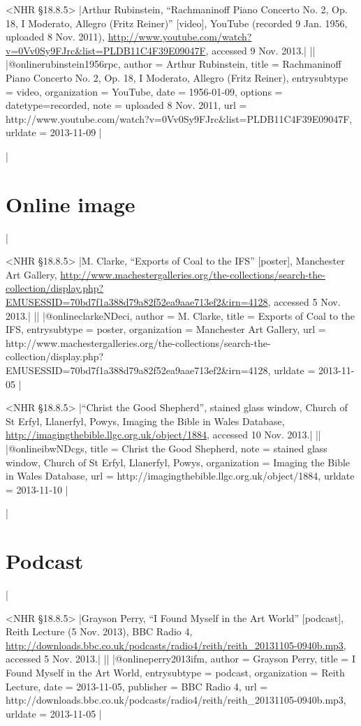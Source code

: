 \documentclass[extrafontsizes,11pt,a4paper,oneside]{memoir}
\begin{document}
\bibexample<NHR \S18.8.5>
|Arthur Rubinstein, \enquote{Rachmaninoff Piano Concerto No. 2, Op. 18, I Moderato, Allegro (Fritz Reiner)} [video], YouTube (recorded 9 Jan. 1956, uploaded 8 Nov. 2011), \url{http://www.youtube.com/watch?v=0Vv0Sy9FJrc&list=PLDB11C4F39E09047F}, accessed 9 Nov. 2013.|%
||%
|@online{rubinstein1956rpc,
  author = {Arthur Rubinstein},
  title = {Rachmaninoff Piano Concerto No. 2, Op. 18, I Moderato, Allegro (Fritz Reiner)},
  entrysubtype = {video},
  organization = {YouTube},
  date = {1956-01-09},
  options = {datetype={recorded}},
  note = {uploaded 8 Nov. 2011},
  url = {http://www.youtube.com/watch?v=0Vv0Sy9FJrc&list=PLDB11C4F39E09047F},
  urldate = {2013-11-09}
}|

\todoc|
\section{Online image}
|

\bibexample<NHR \S18.8.5>
|M. Clarke, \enquote{Exports of Coal to the IFS} [poster], Manchester Art Gallery, \url{http://www.machestergalleries.org/the-collections/search-the-collection/display.php?EMUSESSID=70bd7f1a388d79a82f52ea9aae713ef2&irn=4128}, accessed 5 Nov. 2013.|%
||%
|@online{clarkeNDeci,
  author = {M. Clarke},
  title = {Exports of Coal to the IFS},
  entrysubtype = {poster},
  organization = {Manchester Art Gallery},
  url = {http://www.machestergalleries.org/the-collections/search-the-collection/display.php?EMUSESSID=70bd7f1a388d79a82f52ea9aae713ef2&irn=4128},
  urldate = {2013-11-05}
}|

\bibexample<NHR \S18.8.5>
|\enquote{Christ the Good Shepherd}, stained glass window, Church of St Erfyl, Llanerfyl, Powys, Imaging the Bible in Wales Database, \url{http://imagingthebible.llgc.org.uk/object/1884}, accessed 10 Nov. 2013.|%
||%
|@online{ibwNDcgs,
  title = {Christ the Good Shepherd},
  note = {stained glass window, Church of St Erfyl, Llanerfyl, Powys},
  organization = {Imaging the Bible in Wales Database},
  url = {http://imagingthebible.llgc.org.uk/object/1884},
  urldate = {2013-11-10}
}|

\todoc|
\section{Podcast}
|

\bibexample<NHR \S18.8.5>
|Grayson Perry, \enquote{I Found Myself in the Art World} [podcast], Reith Lecture (5 Nov. 2013), BBC Radio 4, \url{http://downloads.bbc.co.uk/podcasts/radio4/reith/reith_20131105-0940b.mp3}, accessed 5 Nov. 2013.|%
||%
|@online{perry2013ifm,
  author = {Grayson Perry},
  title = {I Found Myself in the Art World},
  entrysubtype = {podcast},
  organization = {Reith Lecture},
  date = {2013-11-05},
  publisher = {BBC Radio 4},
  url = {http://downloads.bbc.co.uk/podcasts/radio4/reith/reith_20131105-0940b.mp3},
  urldate = {2013-11-05}
}|
\end{document}
